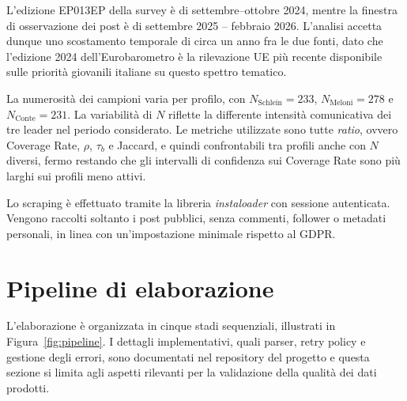 \documentclass[11pt, a4paper]{article}
\begin{document}
L'edizione EP013EP della survey \`e di settembre--ottobre 2024, mentre
la finestra di osservazione dei post \`e di settembre 2025 -- febbraio
2026. L'analisi accetta dunque uno scostamento temporale di circa un
anno fra le due fonti, dato che l'edizione 2024 dell'Eurobarometro \`e
la rilevazione UE pi\`u recente disponibile sulle priorit\`a giovanili
italiane su questo spettro tematico.

La numerosit\`a dei campioni varia per profilo, con
$N_{\text{Schlein}}=233$, $N_{\text{Meloni}}=278$ e
$N_{\text{Conte}}=231$. La variabilit\`a di $N$ riflette la differente
intensit\`a comunicativa dei tre leader nel periodo considerato. Le
metriche utilizzate sono tutte \textit{ratio}, ovvero Coverage Rate,
$\rho$, $\tau_b$ e Jaccard, e quindi confrontabili tra profili anche con
$N$ diversi, fermo restando che gli intervalli di confidenza sui
Coverage Rate sono pi\`u larghi sui profili meno attivi.

Lo scraping \`e effettuato tramite la libreria \textit{instaloader}
\cite{instaloader} con sessione autenticata. Vengono raccolti soltanto
i post pubblici, senza commenti, follower o metadati personali, in
linea con un'impostazione minimale rispetto al GDPR.

\section{Pipeline di elaborazione}

L'elaborazione \`e organizzata in cinque stadi sequenziali, illustrati
in Figura~\ref{fig:pipeline}. I dettagli implementativi, quali parser,
retry policy e gestione degli errori, sono documentati nel repository
del progetto e questa sezione si limita agli aspetti rilevanti per la
validazione della qualit\`a dei dati prodotti.
\end{document}

